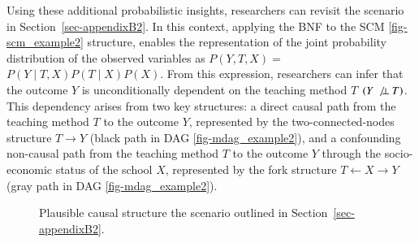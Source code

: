 \documentclass[
  authoryear,
  review,
  1p]{elsarticle}
\begin{document}
Using these additional probabilistic insights, researchers can revisit
the scenario in Section~\ref{sec-appendixB2}. In this context, applying
the BNF to the SCM \ref{fig-scm_example2} structure, enables the
representation of the joint probability distribution of the observed
variables as \(P(Y, T, X) =\) \(P(Y \mid T, X) P(T \mid X) P(X)\). From
this expression, researchers can infer that the outcome \(Y\) is
unconditionally dependent on the teaching method \(T\)
\((Y \:\not\bot\:T)\). This dependency arises from two key structures: a
direct causal path from the teaching method \(T\) to the outcome \(Y\),
represented by the two-connected-nodes structure \(T \rightarrow Y\)
(black path in DAG \ref{fig-mdag_example2}), and a confounding
non-causal path from the teaching method \(T\) to the outcome \(Y\)
through the socio-economic status of the school \(X\), represented by
the fork structure \(T \leftarrow X \rightarrow Y\) (gray path in DAG
\ref{fig-mdag_example2}).

\begin{figure}

\begin{minipage}{0.50\linewidth}

\centering{

\[
\begin{aligned}
  X & := x \\
  T & := f_{T}(x,e_{T}) \\
  Y & := f_{Y}(T,x,e_{Y}) \\
  e_{T} & \:\bot\:e_{X} \\
  e_{T} & \:\bot\:e_{Y} \\
  e_{X} & \:\bot\:e_{Y}
\end{aligned}
\]

}


\end{minipage}%
%
\begin{minipage}{0.50\linewidth}



\end{minipage}%

\caption{\label{fig-example2}Plausible causal structure the scenario
outlined in Section~\ref{sec-appendixB2}.}

\end{figure}%
\end{document}
